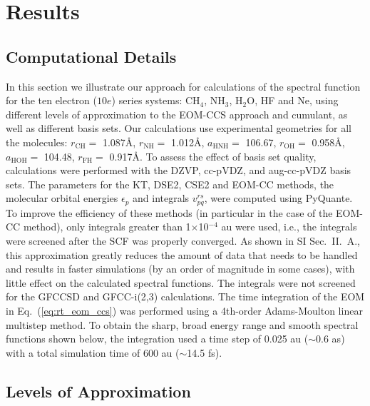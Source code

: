 \documentclass[aps,prb,twocolumn,groupaddress,floatfix]{revtex4}
\begin{document}
\section{Results}
\label{sec:res}

\subsection{Computational Details}

In this section we illustrate our approach for calculations of the
spectral function for the ten electron ($10e$) series systems: CH$_4$, NH$_3$, H$_2$O, HF and Ne, using different levels of approximation
to the EOM-CCS approach and cumulant, as well as different basis sets.
Our calculations use experimental geometries\cite{cccbdb} for all the molecules:
$r_\mathrm{CH}=$ 1.087\AA,  $r_\mathrm{NH}=$ 1.012\AA, $a_\mathrm{HNH}=$
106.67\degree, $r_\mathrm{OH}=$ 0.958\AA, $a_\mathrm{HOH}=$ 104.48\degree, 
$r_\mathrm{FH}=$ 0.917\AA.  To assess the effect of basis set quality,
calculations were performed with the DZVP,\cite{pyquante} cc-pVDZ,\cite{ccpvdz}
and aug-cc-pVDZ\cite{augccpvdz} basis sets.
The parameters for the KT, DSE2, CSE2 and EOM-CC methods, the molecular orbital energies $\epsilon_p$ and integrals $v_{pq}^{rs}$,
were computed using PyQuante.\cite{pyquante} To improve the efficiency of these methods (in particular in the case of the EOM-CC method), only integrals greater than 1$\times$10$^{-4}$ au were used, i.e., the integrals were screened after the SCF was properly converged. As shown in SI Sec.\ II.\ A., this approximation greatly reduces the amount of data that needs to be handled and results in faster simulations (by an order of magnitude in some cases), with little effect on the calculated spectral functions. The integrals were not screened for the GFCCSD and GFCC-i(2,3) calculations.
The time integration of the EOM in
Eq.\ (\ref{eq:rt_eom_ccs}) was performed using a 4th-order
Adams-Moulton linear multistep method.\cite{quarteroni2002} To obtain the sharp,
broad energy range and smooth spectral functions shown below, the integration
used a time step of 0.025 au ($\sim$0.6 as) with a total simulation time of 600
au ($\sim$14.5 fs).

\subsection{Levels of Approximation}
\end{document}
